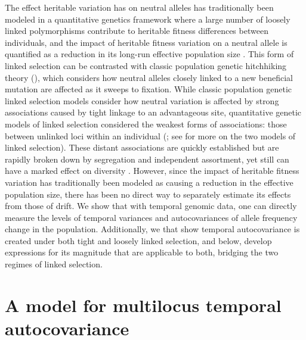 \documentclass[11pt]{article}
\begin{document}
The effect heritable variation has on neutral alleles has traditionally been
modeled in a quantitative genetics framework where a large number of loosely
linked polymorphisms contribute to heritable fitness differences between
individuals, and the impact of heritable fitness variation on a neutral allele
is quantified as a reduction in its long-run effective population size
\parencite{Robertson1961-ho,Santiago1995-hx,Santiago1998-bs}.  This form of
linked selection can be contrasted with classic population genetic hitchhiking
theory (\cite{Maynard_Smith1974-lc}), which considers how neutral alleles
closely linked to a new beneficial mutation are affected as it sweeps to
fixation. While classic population genetic linked selection models consider how
neutral variation is affected by strong associations caused by tight linkage to
an advantageous site, quantitative genetic models of linked selection
considered the weakest forms of associations: those between unlinked loci
within an individual (\cite{Morley1954-yp, Robertson1961-ho, Santiago1995-hx};
see \cite{Barton2000-zg} for more on the two models of linked selection). These
distant associations are quickly established but are rapidly broken down by
segregation and independent assortment, yet still can have a marked effect on
diversity \parencite{Robertson1961-ho,Santiago1995-hx}. However, since the
impact of heritable fitness variation has traditionally been modeled as causing
a reduction in the effective population size, there has been no direct way to
separately estimate its effects from those of drift. We show that with temporal
genomic data, one can directly measure the levels of temporal variances and
autocovariances of allele frequency change in the population. Additionally, we
that show temporal autocovariance is created under both tight and loosely
linked selection, and below, develop expressions for its magnitude that are
applicable to both, bridging the two regimes of linked selection.

\section{A model for multilocus temporal autocovariance}
\end{document}
